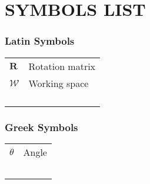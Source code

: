 \chapter*{SYMBOLS LIST}

\subsection*{Latin Symbols}

\begin{tabular}{>{\centering}p{}l}
$\mathbf{R}$ & Rotation matrix\tabularnewline
$\mathcal{W}$ & Working space\tabularnewline
 & \tabularnewline
 & \tabularnewline
 & \tabularnewline
 & \tabularnewline
\end{tabular}

\subsection*{Greek Symbols}

\begin{tabular}{>{\centering}p{}l}
$\theta$ & Angle\tabularnewline
 & \tabularnewline
 & \tabularnewline
 & \tabularnewline
 & \tabularnewline
 & \tabularnewline
\end{tabular}
